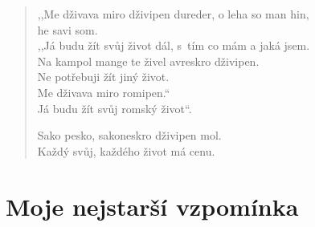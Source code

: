 \begin{verse}
\medskip

,,Me dživava miro dživipen dureder, o leha so man hin,\\
 \hspace{\fill}he savi som. \\
,,Já budu žít svůj život dál, s tím co mám a jaká jsem. \\
Na kampol mange te živel avreskro dživipen. \\
Ne potřebuji žít jiný život. \\
Me dživava miro romipen.`` \\
Já budu žít svůj romský život``.

\medskip

Sako pesko, sakoneskro dživipen mol. \\
Každý svůj, každého život má cenu.

% 
% 
% 
% 
% 
% 
% 
% 
% 
% 
\end{verse}



\section{Moje nejstarší vzpomínka}

